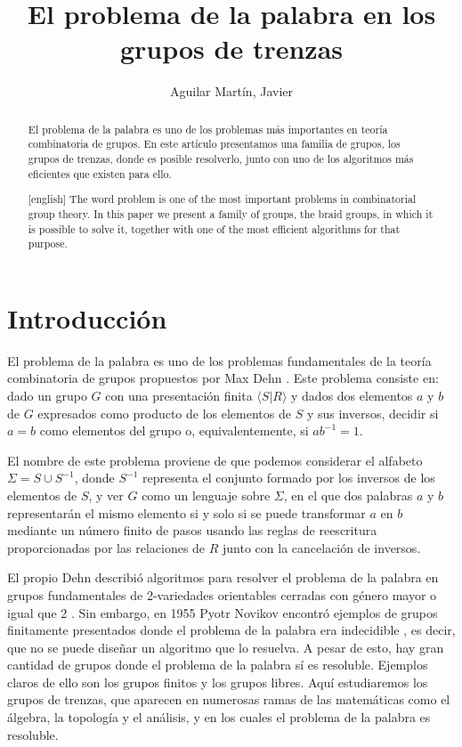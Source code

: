 \documentclass[bibtex, anon]{TEMat-article}
\title[]{El problema de la palabra en los grupos de trenzas}
\author*{Aguilar Martín, Javier}
\affiliation{Universidad de Sevilla (US)}
\begin{document}
\begin{abstract}
El problema de la palabra es uno de los problemas más importantes en teoría combinatoria de grupos. En este artículo presentamos una familia de grupos, los grupos de trenzas, donde es posible resolverlo, junto con uno de los algoritmos más eficientes que existen para ello. 
\end{abstract}
\begin{abstract}[english]
The word problem is one of the most important problems in combinatorial group theory. In this paper we present a family of groups, the braid groups, in which it is possible to solve it, together with one of the most efficient algorithms for that purpose.
\end{abstract}
\maketitle

\section{Introducción}


El problema de la palabra es uno de los problemas fundamentales de la teoría combinatoria de grupos propuestos por Max Dehn \cite{Dehn11}. Este problema consiste en: dado un grupo $G$ con una presentación finita $\langle S| R\rangle$ y dados dos elementos $a$ y $b$ de $G$ expresados como producto de los elementos de $S$ y sus inversos, decidir si $a=b$ como elementos del grupo o, equivalentemente, si $ab^{-1}=1$.

El nombre de este problema proviene de que podemos considerar el alfabeto $\Sigma=S\cup S^{-1}$, donde $S^{-1}$ representa el conjunto formado por los inversos de los elementos de $S$, y ver $G$ como un lenguaje sobre $\Sigma$, en el que dos palabras $a$ y $b$ representarán el mismo elemento si y solo si se puede transformar $a$ en $b$ mediante un número finito de pasos usando las reglas de reescritura proporcionadas por las relaciones de $R$ junto con la cancelación de inversos.  

El propio Dehn describió algoritmos para resolver el problema de la palabra en grupos fundamentales de 2-variedades orientables cerradas con género mayor o igual que 2 \cite{Dehn12}. Sin embargo, en 1955 Pyotr Novikov encontró ejemplos de grupos finitamente presentados donde el problema de la palabra era indecidible \cite{Novikov}, es decir, que no se puede diseñar un algoritmo que lo resuelva. A pesar de esto, hay gran cantidad de grupos donde el problema de la palabra sí es resoluble. Ejemplos claros de ello son los grupos finitos y los grupos libres. Aquí estudiaremos los grupos de trenzas, que aparecen en numerosas ramas de las matemáticas como el álgebra, la topología y el análisis, y en los cuales el problema de la palabra es resoluble.
\end{document}
